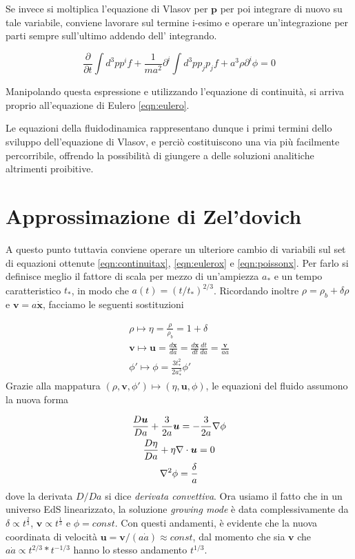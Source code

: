 Se invece si moltiplica l'equazione di Vlasov per $\bm{p}$ per poi integrare di nuovo su tale variabile, 
conviene lavorare sul termine i-esimo e operare un'integrazione per parti sempre sull'ultimo addendo dell'
integrando.

\begin{equation}
    \frac{\partial }{\partial t} \int d^3 p p^i f + \frac{1}{ma^2} \partial^i \int d^3 p p_j p_j f + a^3 \rho \partial^i \phi = 0 
\end{equation}

Manipolando questa espressione e utilizzando l'equazione di continuità, si arriva proprio all'equazione di Eulero
\ref{eqn:eulero}.

Le equazioni della fluidodinamica rappresentano dunque i primi termini dello sviluppo dell'equazione di Vlasov,
e perciò costituiscono una via più facilmente percorribile, offrendo la possibilità di giungere a delle soluzioni
analitiche altrimenti proibitive.


\section{Approssimazione di Zel'dovich}

A questo punto tuttavia conviene operare un ulteriore cambio di variabili sul set di equazioni ottenute \ref{eqn:continuitax},
\ref{eqn:eulerox} e \ref{eqn:poissonx}. Per farlo si definisce meglio il fattore di scala per mezzo di un'ampiezza $a_{*}$ e
un tempo caratteristico $t_{*}$, in modo che $a(t) = (t / t_{*})^{2/3}$. Ricordando inoltre $\rho = \rho_b + \delta\rho$ e 
$\bm{v} = a \dot{\bm{x}}$, facciamo le seguenti sostituzioni

\begin{gather}
    \rho \mapsto \eta = \frac{\rho}{\rho_b} = 1 + \delta \\
    \bm{v} \mapsto \bm{u} = \frac{d\bm{x}}{da} = \frac{d\bm{x}}{dt}\frac{dt}{da} = \frac{\bm{v}}{a\dot{a}} \\
    \phi{'} \mapsto \phi = \frac{3t_{*}^2}{2a_{*}^3}\phi{'}
\end{gather}
Grazie alla mappatura $(\rho, \bm{v}, \phi{'})\mapsto(\eta, \bm{u}, \phi)$, le equazioni del fluido assumono
la nuova forma 

\begin{gather}
    \frac{D\bm{u}}{Da} + \frac{3}{2a}\bm{u} = -\frac{3}{2a}\nabla\phi \\
    \frac{D\eta}{Da} + \eta \nabla \cdot \bm{u} = 0 \\
    \laplacian \phi = \frac{\delta}{a}
\end{gather}
dove la derivata $D/Da$ si dice \textit{derivata convettiva}.
Ora usiamo il fatto che in un universo EdS linearizzato, la soluzione \textit{growing mode} è data complessivamente
da  $\delta \propto t^{\frac{2}{3}}$, $\bm{v} \propto t^{\frac{1}{3}}$ e $\phi = const$. Con questi andamenti, è
evidente che la nuova coordinata di velocità $\bm{u} = \bm{v} / (a\dot{a}) \approx const$, dal momento che sia 
$\bm{v}$ che $a\dot{a} \propto t^{2/3} * t^{-1/3}$ hanno lo stesso andamento $t^{1/3}$.

